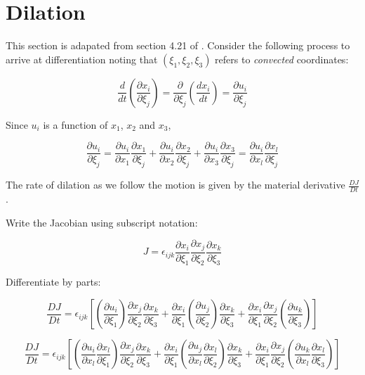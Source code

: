 \section{Dilation}
\label{materialderivative}

This section is adapated from section 4.21 of \cite{aris}. Consider the following process to arrive at differentiation noting that $\left( \xi_1, \xi_2, \xi_3 \right)$ refers to {\em convected} coordinates:

$$ \frac{d}{dt} \left( \frac{\partial x_i}{\partial \xi_j} \right) = \frac{\partial}{\partial \xi_j} \left( \frac{d x_i}{dt} \right) = \frac{\partial u_i}{\partial \xi_j} $$

Since $u_i$ is a function of $x_1$, $x_2$ and $x_3$,

$$ \frac{\partial u_i}{\partial \xi_j} = 
\frac{\partial u_i}{\partial x_1} \frac{\partial x_1}{\partial \xi_j} +
\frac{\partial u_i}{\partial x_2} \frac{\partial x_2}{\partial \xi_j} +
\frac{\partial u_i}{\partial x_3} \frac{\partial x_3}{\partial \xi_j} =
\frac{\partial u_i}{\partial x_l} \frac{\partial x_l}{\partial \xi_j} 
$$


The rate of dilation as we follow the motion is given by the material derivative $\frac{DJ}{Dt}$. 

Write the Jacobian using subscript notation:

$$ J = \epsilon_{ijk} \frac{\partial x_i}{\partial \xi_1} \frac{\partial x_j}{\partial \xi_2} \frac{\partial x_k}{\partial \xi_3} $$

Differentiate by parts:

$$ \frac{DJ}{Dt} = \epsilon_{ijk} \left[
\left( \frac{\partial u_i}{\partial \xi_1} \right) \frac{\partial x_j}{\partial \xi_2} \frac{\partial x_k}{\partial \xi_3} +
\frac{\partial x_i}{\partial \xi_1} \left( \frac{\partial u_j}{\partial \xi_2} \right) \frac{\partial x_k}{\partial \xi_3} +
\frac{\partial x_i}{\partial \xi_1} \frac{\partial x_j}{\partial \xi_2} \left( \frac{\partial u_k}{\partial \xi_3} \right) \right]
$$

$$ \frac{DJ}{Dt} = \epsilon_{ijk} \left[
\left( \frac{\partial u_i}{\partial x_l} \frac{\partial x_l}{\partial \xi_1} \right) \frac{\partial x_j}{\partial \xi_2} \frac{\partial x_k}{\partial \xi_3} +
\frac{\partial x_i}{\partial \xi_1} \left( \frac{\partial u_j}{\partial x_l} \frac{\partial x_l}{\partial \xi_2} \right) \frac{\partial x_k}{\partial \xi_3} +
\frac{\partial x_i}{\partial \xi_1} \frac{\partial x_j}{\partial \xi_2} \left( \frac{\partial u_k}{\partial x_l} \frac{\partial x_l}{\partial \xi_3} \right) \right]
$$

